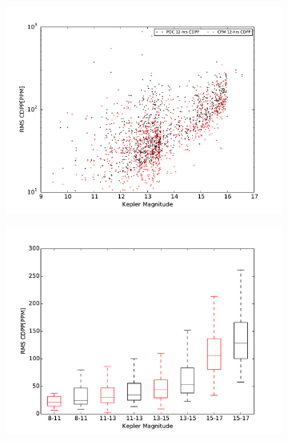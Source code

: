 \documentclass[12pt, preprint]{aastex}
\begin{document}
\begin{figure}[htb]
\centering
\begin{subfigure}[htb]{0.33\columnwidth}
\includegraphics[width=\columnwidth]{pdc_cdpp12_r}
\caption{}
\end{subfigure}%
\begin{subfigure}[htb]{0.33\columnwidth}
\includegraphics[width=\columnwidth]{boxplot_r}
\caption{}
\end{subfigure}%
\begin{subfigure}[htb]{0.33\columnwidth}

\end{subfigure}
\end{figure}
\end{document}
